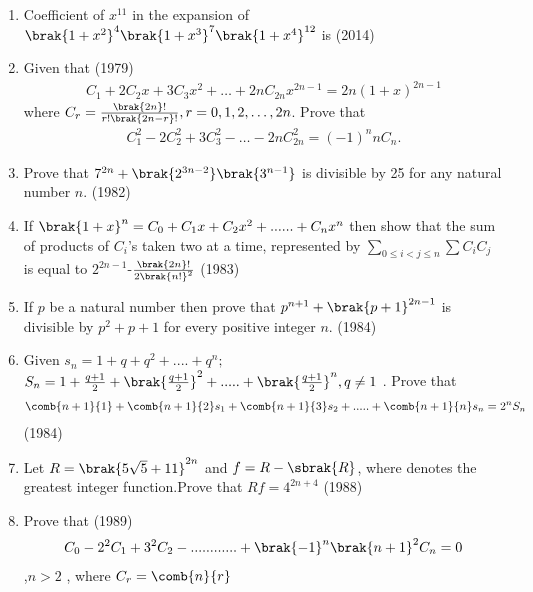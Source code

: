\begin{enumerate}[label=\thesubsection.\arabic*,ref=\thesubsection.\theenumi]
\item  Coefficient of $x^{11}$ in the expansion of $ \brak{1+x^2}^4 \brak{1+x^3}^7 \brak{1+x^4}^{12}$ is \hfill(2014)

\begin{enumerate}
\end{enumerate}

 \item Given that  \hfill{(1979)} 
			  \begin{align*}
C_1 + 2C_2x + 3C_3x^2 + \dots + 2nC_{2n}x^{2n-1}   =    2n(1+x)^{2n-1} 
			  \end{align*}
		where $C_r =\frac{\brak{2n}!}{r!\brak{2n-r}!}, r=0,1,2,\dots,2n$.     Prove that  \begin{align*} 
		     C^2_1-2C_2^2+3C_3^2-\dots-2nC_{2n}^2  = (-1)^nnC_n. 
		     \end{align*}          
 \item Prove that $ 7^{2n} + \brak{2^{3n-2}}  \brak{3^{n-1}} $ is divisible by 25 for any natural number $ n$. \hfill{(1982)}  
\item If $ \brak{1+x}^n= C_0 + C_1x +C_2x^2+......+C_nx^n $ then show that the sum of products of $ C_i $'s taken
		   two at a time, represented by $ \sum\limits_{0 \leq i<j \leq n}^{}\sum C_i C_j $ is equal to $ 2^{2n-1}$-$\frac{\brak{2n}!} {2\brak{n!}^2} $ \hfill{(1983)}
 \item If $ p $ be a natural number then prove that $ p^{n+1}+\brak{p+1}^{2n-1} $ is divisible by $ p^2+p+1 $ for every positive integer $n$. \hfill{(1984)} 
 \item Given  $ s_n = 1 + q + q^2 +....+q^n;$
		    $ S_n = 1 + \frac{q+1}{2}+\brak{\frac{q+1}{2}}^2+.....+\brak{\frac{q+1}{2}}^n,q\neq1 $ . Prove that
		     \begin{align*} 
			    \comb{n+1}{1}+\comb{n+1}{2}s_1+\comb{n+1}{3}s_2+.....+\comb{n+1}{n}s_n=2^nS_n
		    \end{align*}    \hfill{(1984)}

  \item Let $ R =\brak{5\sqrt{5}+11}^{2n} $ and $ f = R -\sbrak{R} $, where \sbrak{} denotes the greatest integer function.Prove  that $ Rf =4^{2n+4 } $  \hfill {(1988)}
\item Prove that \hfill{(1989)}
		    \begin{align*} 
		    C_0-2^2C_1+3^2C_2-............+\brak{-1}^n\brak{n+1}^2C_n =0
		    \end{align*},$n>2$ , where $C_r =\comb{n}{r}$
		    


\end{enumerate}
